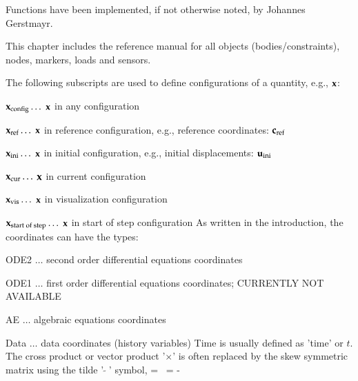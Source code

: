 \documentclass[11pt,a4paper]{book} %
\newcommand{\cIni}{_\mathrm{ini}} %
\newcommand{\cRef}{_\mathrm{ref}} %
\newcommand{\cCur}{_\mathrm{cur}} %
\newcommand{\cVis}{_\mathrm{vis}} %
\newcommand{\cSOS}{_\mathrm{start\;of\;step}}
\newcommand{\cConfig}{_\mathrm{config}} %
\begin{document}
Functions have been implemented, if not otherwise noted, by Johannes Gerstmayr.




 \label{sec_item_reference_manual}
This chapter includes the reference manual for all objects (bodies/constraints), nodes, markers, loads and sensors.

%
The following subscripts are used to define configurations of a quantity, e.g., $\mathbf{x}$:
\bi
  \item $\xv\cConfig \ldots$ $\mathbf{x}$ in any configuration
  \item $\xv\cRef \ldots$ $\mathbf{x}$ in reference configuration, e.g., reference coordinates: $\cv\cRef$
  \item $\xv\cIni \ldots$ $\mathbf{x}$ in initial configuration, e.g., initial displacements: $\uv\cIni$
  \item $\xv\cCur \ldots$ $\mathbf{x}$ in current configuration
  \item $\xv\cVis \ldots$ $\mathbf{x}$ in visualization configuration
  \item $\xv\cSOS \ldots$ $\mathbf{x}$ in start of step configuration
\ei
As written in the introduction, the coordinates can have the types:
\bi
  \item ODE2 $\ldots$ second order differential equations coordinates
  \item ODE1 $\ldots$ first order differential equations coordinates; CURRENTLY NOT AVAILABLE
  \item AE $\ldots$ algebraic equations coordinates
  \item Data $\ldots$ data coordinates (history variables)
\ei
Time is usually defined as 'time' or $t$.
The cross product or vector product '$\times$' is often replaced by the skew symmetric matrix using the tilde '$\tilde{\;\;}$' symbol,
\be
  \av \times \bv = \tilde \av \, \bv = -\tilde \bv \, \av
\ee
\end{document}
